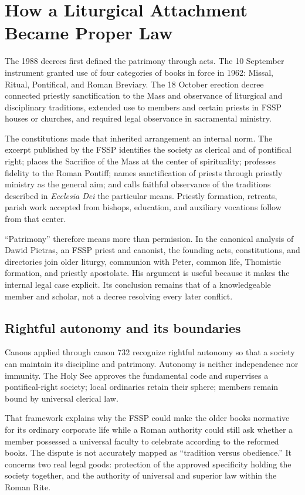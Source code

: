 \section{How a Liturgical Attachment Became Proper Law}

The 1988 decrees first defined the patrimony through acts. The 10 September instrument granted use of four categories of books in force in 1962: Missal, Ritual, Pontifical, and Roman Breviary. The 18 October erection decree connected priestly sanctification to the Mass and observance of liturgical and disciplinary traditions, extended use to members and certain priests in FSSP houses or churches, and required legal observance in sacramental ministry.

The constitutions made that inherited arrangement an internal norm. The excerpt published by the FSSP identifies the society as clerical and of pontifical right; places the Sacrifice of the Mass at the center of spirituality; professes fidelity to the Roman Pontiff; names sanctification of priests through priestly ministry as the general aim; and calls faithful observance of the traditions described in \emph{Ecclesia Dei} the particular means. Priestly formation, retreats, parish work accepted from bishops, education, and auxiliary vocations follow from that center.

``Patrimony'' therefore means more than permission. In the canonical analysis of Dawid Pietras, an FSSP priest and canonist, the founding acts, constitutions, and directories join older liturgy, communion with Peter, common life, Thomistic formation, and priestly apostolate. His argument is useful because it makes the internal legal case explicit. Its conclusion remains that of a knowledgeable member and scholar, not a decree resolving every later conflict.

\subsection{Rightful autonomy and its boundaries}

Canons applied through canon 732 recognize rightful autonomy so that a society can maintain its discipline and patrimony. Autonomy is neither independence nor immunity. The Holy See approves the fundamental code and supervises a pontifical-right society; local ordinaries retain their sphere; members remain bound by universal clerical law.

That framework explains why the FSSP could make the older books normative for its ordinary corporate life while a Roman authority could still ask whether a member possessed a universal faculty to celebrate according to the reformed books. The dispute is not accurately mapped as ``tradition versus obedience.'' It concerns two real legal goods: protection of the approved specificity holding the society together, and the authority of universal and superior law within the Roman Rite.

